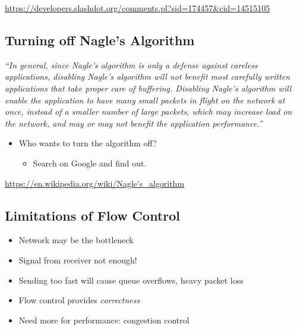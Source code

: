 \url{https://developers.slashdot.org/comments.pl?sid=174457&cid=14515105}

\subsection{Turning off Nagle's Algorithm}
\emph{``In general, since Nagle's algorithm is only a defense against careless applications, disabling Nagle’s algorithm will not benefit most carefully written applications that take proper care of buffering. Disabling Nagle’s algorithm will enable the application to have many small packets in flight on the network at once, instead of a smaller number of large packets, which may increase load on the network, and may or may not benefit the application performance.''}

\begin{itemize}[nosep]
    \item Who wants to turn the algorithm off?
          \begin{itemize}[nosep]
              \item Search on Google and find out.
          \end{itemize}
\end{itemize}
\url{https://en.wikipedia.org/wiki/Nagle's_algorithm}

\subsection{Limitations of Flow Control}
\begin{itemize}[nosep]
    \item Network may be the bottleneck
    \item Signal from receiver not enough!
    \item Sending too fast will cause queue overflows, heavy packet loss
    \item Flow control provides \emph{correctness}
    \item Need more for performance: congestion control
\end{itemize}

